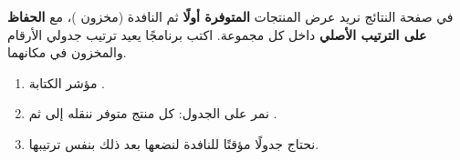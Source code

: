 \begin{statement}
في صفحة النتائج نريد عرض المنتجات \textbf{المتوفرة أولًا} ثم النافدة (مخزون )، مع \textbf{الحفاظ على الترتيب الأصلي} داخل كل مجموعة. اكتب برنامجًا يعيد ترتيب جدولي الأرقام والمخزون في مكانهما.
\end{statement}
\begin{stepsbox}\begin{enumerate}
\item مؤشر الكتابة .
\item نمر على الجدول: كل منتج متوفر ننقله إلى  ثم .
\item نحتاج جدولًا مؤقتًا للنافدة لنضعها بعد ذلك بنفس ترتيبها.
\end{enumerate}\end{stepsbox}
